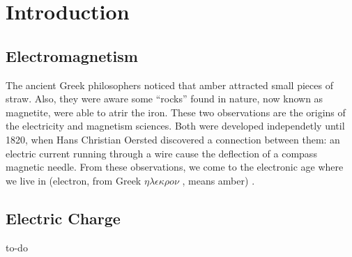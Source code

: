 \section{Introduction}

\subsection{Electromagnetism}

The ancient Greek philosophers noticed that amber attracted small
pieces of straw. Also, they were aware some ``rocks'' found in nature,
now known as magnetite, were able to atrir the iron.  These two
observations are the origins of the electricity and magnetism sciences.
Both were developed independetly until 1820, when Hans Christian Oersted
discovered a connection between them: an electric current running through 
a wire cause the deflection of a compass magnetic needle.  From these
observations, we come to the electronic age where we live in (electron,
from Greek
$\eta\lambda\epsilon\kappa\rho o\nu$ , 
means amber) \cite{halliday}.

\subsection{Electric Charge}

to-do
